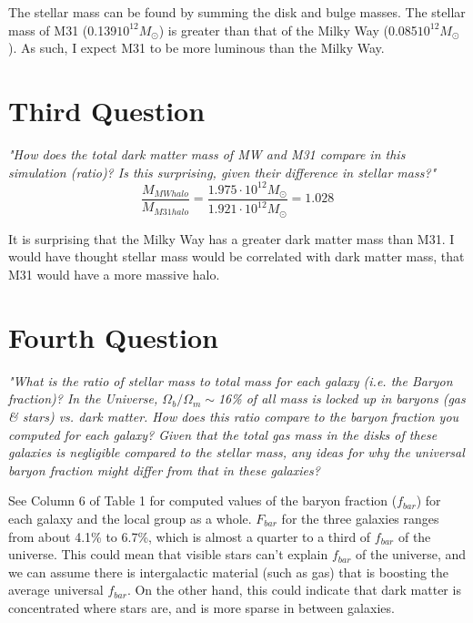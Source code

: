 \documentclass{article}
\begin{document}
The stellar mass can be found by summing the disk and bulge masses. The stellar mass of M31 (0.139\cdot$10^{12}$\( M_\odot\)) is greater than that of the Milky Way (0.085\cdot$10^{12}$\( M_\odot\)). As such, I expect M31 to be more luminous than the Milky Way.

\section{Third Question}
\textit{"How does the total dark matter mass of MW and M31 compare in this simulation
(ratio)? Is this surprising, given their difference in stellar mass?"}
\[\frac{M_{MWhalo}}{M_{M31halo}} = \frac{1.975\cdot10^{12}M_\odot}{1.921\cdot10^{12}M_\odot} = 1.028\]

It is surprising that the Milky Way has a greater dark matter mass than M31. I would have thought stellar mass would be correlated with dark matter mass, that M31 would have a more massive halo. 

\section{Fourth Question}
\textit{"What is the ratio of stellar mass to total mass for each galaxy (i.e. the Baryon fraction)? In the Universe, \(\Omega_b/\Omega_m \sim\)16\% of all mass is locked up in baryons (gas \& stars) vs. dark matter. How does this ratio compare to the baryon fraction you computed for each galaxy? Given that the total gas mass in the disks of these galaxies is negligible compared to the stellar mass, any ideas for why the universal baryon fraction might differ from that in these galaxies?}

See Column 6 of Table 1 for computed values of the baryon fraction (\(f_{bar}\)) for each galaxy and the local group as a whole. \(F_{bar}\) for the three galaxies ranges from about 4.1\% to 6.7\%, which is almost a quarter to a third of \(f_{bar}\) of the universe. This could mean that visible stars can't explain \(f_{bar}\) of the universe, and we can assume there is intergalactic material (such as gas) that is boosting the average universal \(f_{bar}\). On the other hand, this could indicate that dark matter is concentrated where stars are, and is more sparse in between galaxies.
\end{document}
